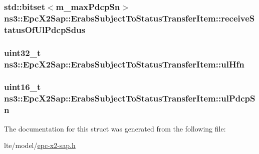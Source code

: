 \subsubsection[{\texorpdfstring{receive\+Status\+Of\+Ul\+Pdcp\+Sdus}{receiveStatusOfUlPdcpSdus}}]{\setlength{\rightskip}{0pt plus 5cm}std\+::bitset$<${\bf m\+\_\+max\+Pdcp\+Sn}$>$ ns3\+::\+Epc\+X2\+Sap\+::\+Erabs\+Subject\+To\+Status\+Transfer\+Item\+::receive\+Status\+Of\+Ul\+Pdcp\+Sdus}\hypertarget{structns3_1_1EpcX2Sap_1_1ErabsSubjectToStatusTransferItem_a32bf29a8c3d8aa391bcebac2c813afa2}{}\label{structns3_1_1EpcX2Sap_1_1ErabsSubjectToStatusTransferItem_a32bf29a8c3d8aa391bcebac2c813afa2}
\subsubsection[{\texorpdfstring{ul\+Hfn}{ulHfn}}]{\setlength{\rightskip}{0pt plus 5cm}uint32\+\_\+t ns3\+::\+Epc\+X2\+Sap\+::\+Erabs\+Subject\+To\+Status\+Transfer\+Item\+::ul\+Hfn}\hypertarget{structns3_1_1EpcX2Sap_1_1ErabsSubjectToStatusTransferItem_a1481c57b5951d1d2f93fd7a35d38d5cf}{}\label{structns3_1_1EpcX2Sap_1_1ErabsSubjectToStatusTransferItem_a1481c57b5951d1d2f93fd7a35d38d5cf}
\subsubsection[{\texorpdfstring{ul\+Pdcp\+Sn}{ulPdcpSn}}]{\setlength{\rightskip}{0pt plus 5cm}uint16\+\_\+t ns3\+::\+Epc\+X2\+Sap\+::\+Erabs\+Subject\+To\+Status\+Transfer\+Item\+::ul\+Pdcp\+Sn}\hypertarget{structns3_1_1EpcX2Sap_1_1ErabsSubjectToStatusTransferItem_aef54221f1ca1176b0fc4404a87ed36dc}{}\label{structns3_1_1EpcX2Sap_1_1ErabsSubjectToStatusTransferItem_aef54221f1ca1176b0fc4404a87ed36dc}


The documentation for this struct was generated from the following file\+:\begin{DoxyCompactItemize}
\item 
lte/model/\hyperlink{epc-x2-sap_8h}{epc-\/x2-\/sap.\+h}\end{DoxyCompactItemize}
